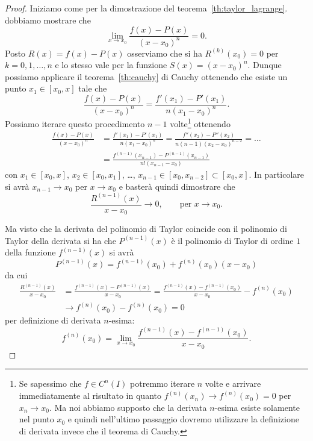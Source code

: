 \begin{proof}
\mymark{**}
Iniziamo come per la dimostrazione del teorema~\ref{th:taylor_lagrange}.
dobbiamo
mostrare che
\[
  \lim_{x\to x_0} \frac{f(x)- P(x)}{(x-x_0)^n} = 0.
\]
Posto $R(x) = f(x)-P(x)$
osserviamo che si ha $R^{(k)}(x_0) =  0$ per $k=0,1, \dots, n$
e lo stesso vale per la funzione $S(x) = (x-x_0)^n$.
Dunque possiamo applicare il teorema~\ref{th:cauchy} di Cauchy ottenendo
che esiste un punto $x_1\in[x_0,x]$ tale che
\[
  \frac{f(x)-P(x)}{(x-x_0)^n} = \frac{f'(x_1)-P'(x_1)}{n(x_1-x_0)^n}.
\]
Possiamo iterare questo procedimento $n-1$ volte\footnote{%
Se sapessimo che $f\in C^n(I)$ potremmo iterare $n$ volte e arrivare immediatamente al risultato
in quanto $f^{(n)}(x_n)\to f^{(n)}(x_0) = 0$ per $x_n\to x_0$.
Ma noi abbiamo supposto che la derivata $n$-esima esiste solamente nel punto $x_0$
e quindi nell'ultimo passaggio dovremo utilizzare la definizione di derivata invece
che il teorema di Cauchy.}
ottenendo
\begin{align*}
  \frac{f(x) - P(x)}{(x-x_0)^n}
  &= \frac{f'(x_1)-P'(x_1)}{n(x_1-x_0)^n}
  = \frac{f''(x_2)-P''(x_2)}{n(n-1)(x_2-x_0)^{n-2}}
  = \dots \\
  &= \frac{f^{(n-1)}(x_{n-1}) - P^{(n-1)}(x_{n-1})}{n!(x_{n-1}-x_0)}
\end{align*}
con $x_1 \in [x_0,x]$, $x_2\in [x_0,x_1]$, \dots, $x_{n-1} \in [x_0,x_{n-2}]\subset[x_0,x]$.
In particolare si avrà $x_{n-1}\to x_0$ per $x\to x_0$ e basterà
quindi dimostrare che
\[
\frac{R^{(n-1)}(x)}{x-x_0} \to 0, \qquad \text{per $x\to x_0$}.
\]

Ma visto che la derivata del polinomio di Taylor coincide con il
polinomio di Taylor della derivata si ha che $P^{(n-1)}(x)$
è il polinomio di Taylor di ordine $1$ della funzione $f^{(n-1)}(x)$
si avrà
\[
  P^{(n-1)} (x) = f^{(n-1)}(x_0) + f^{(n)}(x_0) (x-x_0)
\]
da cui
\begin{align*}
\frac{R^{(n-1)}(x)}{x-x_0}
&= \frac{f^{(n-1)}(x) - P^{(n-1)}(x)}{x-x_0}
= \frac{f^{(n-1)}(x) - f^{(n-1)}(x_0)}{x-x_0} - f^{(n)}(x_0)\\
&\to f^{(n)}(x_0) - f^{(n)}(x_0)
 = 0
\end{align*}
per definizione di derivata $n$-esima:
\[
  f^{(n)}(x_0) = \lim_{x\to x_0} \frac{f^{(n-1)}(x)-f^{(n-1)}(x_0)}{x-x_0}.
\]

\end{proof}
